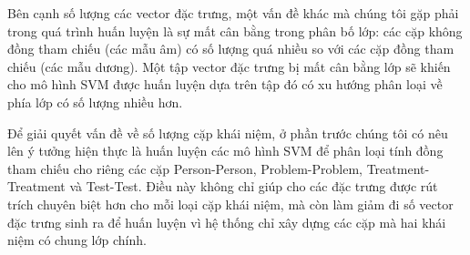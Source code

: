 Bên cạnh số lượng các vector đặc trưng, một vấn đề khác mà chúng tôi gặp phải trong quá trình huấn luyện là sự mất cân bằng trong phân bố lớp: các cặp không đồng tham chiếu (các mẫu âm) có số lượng quá nhiều so với các cặp đồng tham chiếu (các mẫu dương). Một tập vector đặc trưng bị mất cân bằng lớp sẽ khiến cho mô hình SVM được huấn luyện dựa trên tập đó có xu hướng phân loại về phía lớp có số lượng nhiều hơn. 

Để giải quyết vấn đề về số lượng cặp khái niệm, ở phần trước chúng tôi có nêu lên ý tưởng hiện thực là huấn luyện các mô hình SVM để phân loại tính đồng tham chiếu cho riêng các cặp Person-Person, Problem-Problem, Treatment-Treatment và Test-Test. Điều này không chỉ giúp cho các đặc trưng được rút trích chuyên biệt hơn cho mỗi loại cặp khái niệm, mà còn làm giảm đi số vector đặc trưng sinh ra để huấn luyện vì hệ thống chỉ xây dựng các cặp mà hai khái niệm có chung lớp chính.

